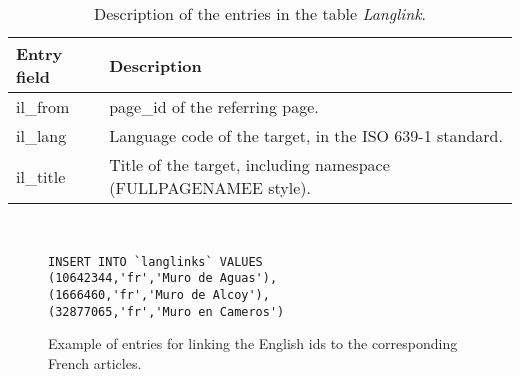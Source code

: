 \begin{table}[ht]
\renewcommand{\arraystretch}{1.25}
\begin{tabularx}{\textwidth}{l|X}
\textbf{Entry field} &  \textbf{Description} \\ \hline
 il\_from & page\_id of the referring page.\\ \hline
 il\_lang & Language code of the target, in the ISO 639-1 standard. \\  \hline
 il\_title & Title of the target, including namespace 
 (FULLPAGENAMEE style).
\end{tabularx}
\\[10pt]
\caption[Description of the entry fields in the table \emph{Langlink}]{Description of the entries in the table \emph{Langlink}.}
\label{tab:langlinkdesc}
\end{table}

\begin{figure}[h]
\centering
\begin{lstlisting}
INSERT INTO `langlinks` VALUES 
(10642344,'fr','Muro de Aguas'),
(1666460,'fr','Muro de Alcoy'),
(32877065,'fr','Muro en Cameros')
\end{lstlisting}
\caption[Example of langlink \texttt{INSERT} statement]{Example of entries for linking the English ids to the corresponding French articles.}
\label{fig:langlinkexample}
\end{figure}

\begin{comment}
A general approach for creating a dictionary-based classifier for another language is to sort all links between English and the desirable language. Then "translate" the English dictionary by using the page id from the links. 
\end{comment}



